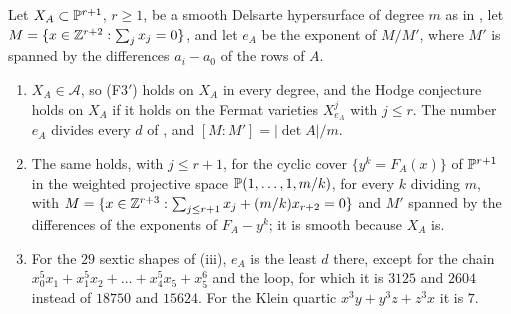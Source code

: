 \begin{corollary}
\label{cor:delsarteall}
Let $X_{A}\subset\mathbb{P}^{r+1}$, $r\ge1$, be a smooth Delsarte hypersurface of
degree $m$ as in , let $M=\{x\in\mathbb{Z}^{r+2}:\sum_{j}x_{j}=0\}$,
and let $e_{A}$ be the exponent of $M/M'$, where $M'$ is spanned by the
differences $a_{i}-a_{0}$ of the rows of $A$.
\begin{enumerate}[label=\textup{(\roman*)},leftmargin=2.6em,itemsep=2pt]
\item $X_{A}\in\mathcal{A}$, so \textup{(F3$'$)} holds on $X_{A}$ in every
  degree, and the Hodge conjecture holds on $X_{A}$ if it holds on the Fermat
  varieties $X^{j}_{e_{A}}$ with $j\le r$. The number $e_{A}$ divides every
  $d$ of , and $[M:M']=|\det A|/m$.
\item The same holds, with $j\le r+1$, for the cyclic cover
  $\{y^{k}=F_{A}(x)\}$ of $\mathbb{P}^{r+1}$ in the weighted projective space
  $\mathbb{P}(1,\dots,1,m/k)$, for every $k$ dividing $m$, with
  $M=\{x\in\mathbb{Z}^{r+3}:\sum_{j\le r+1}x_{j}+(m/k)x_{r+2}=0\}$ and $M'$ spanned
  by the differences of the exponents of $F_{A}-y^{k}$; it is smooth
  because $X_{A}$ is.
\item For the $29$ sextic shapes of (iii), $e_{A}$ is the
  least $d$ there, except for the chain $x_{0}^{5}x_{1}+x_{1}^{5}x_{2}+\dots
  +x_{4}^{5}x_{5}+x_{5}^{6}$ and the loop, for which it is $3125$ and $2604$
  instead of $18750$ and $15624$. For the Klein quartic
  $x^{3}y+y^{3}z+z^{3}x$ it is $7$.
\end{enumerate}
\end{corollary}

